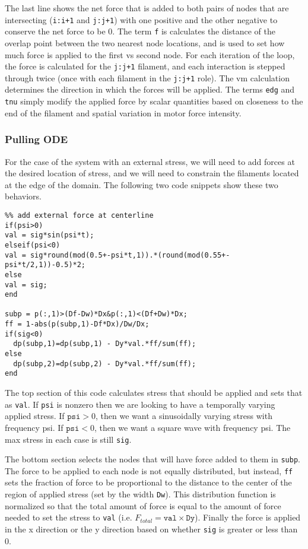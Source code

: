The last line shows the net force that is added to both pairs of nodes that are intersecting (\texttt{i:i+1} and \texttt{j:j+1}) with one positive and the other negative to conserve the net force to be 0.  The term \texttt{f} is calculates the distance of the overlap point between the two nearest node locations, and is used to set how much force is applied to the first vs second node.  For each iteration of the loop, the force is calculated for the \texttt{j:j+1} filament, and each interaction is stepped through twice (once with each filament in the \texttt{j:j+1} role).  The vm calculation determines the direction in which the forces will be applied.  The terms \texttt{edg} and \texttt{tnu} simply modify the applied force by scalar quantities based on closeness to the end of the filament and spatial variation in motor force intensity.



\subsubsection{Pulling ODE}

For the case of the system with an external stress, we will need to add forces at the desired location of stress, and we will need to constrain the filaments located at the edge of the domain.  The following two code snippets show these two behaviors.


\begin{verbatim}
%% add external force at centerline
if(psi>0)
val = sig*sin(psi*t);
elseif(psi<0)
val = sig*round(mod(0.5+-psi*t,1)).*(round(mod(0.55+-psi*t/2,1))-0.5)*2;
else
val = sig;
end

subp = p(:,1)>(Df-Dw)*Dx&p(:,1)<(Df+Dw)*Dx;
ff = 1-abs(p(subp,1)-Df*Dx)/Dw/Dx;
if(sig<0)
  dp(subp,1)=dp(subp,1) - Dy*val.*ff/sum(ff);
else
  dp(subp,2)=dp(subp,2) - Dy*val.*ff/sum(ff);
end
\end{verbatim}

The top section of this code calculates stress that should be applied and sets that as \texttt{val}.  If \texttt{psi} is nonzero then we are looking to have a temporally varying applied stress.  If $\texttt{psi}>0$, then we want a sinusoidally varying stress with frequency psi.  If $\texttt{psi}<0$, then we want a square wave with frequency psi.  The max stress in each case is still \texttt{sig}.

The bottom section selects the nodes that will have force added to them in \texttt{subp}.  The force to be applied to each node is not equally distributed, but instead, \texttt{ff} sets the fraction of force to be proportional to the distance to the center of the region of applied stress (set by the width \texttt{Dw}).  This distribution function is normalized so that the total amount of force is equal to the amount of force needed to set the stress to \texttt{val} (i.e. $F_{total} = \texttt{val} \times \texttt{Dy}$).  Finally the force is applied in the x direction or the y direction based on whether \texttt{sig} is greater or less than 0.


